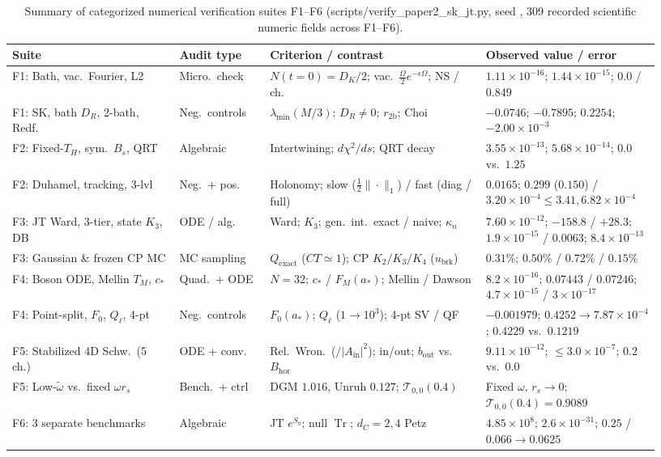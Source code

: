 \documentclass[11pt,a4paper]{article}
\theoremstyle{definition}
\theoremstyle{remark}
\newcommand{\Tr}{\operatorname{Tr}}
\newcommand{\cT}{\mathcal{T}}
\newcommand{\1}{\mathbf{1}}
\newcommand{\code}[1]{{\scriptsize\ttfamily #1}}
\begin{document}
\begin{table}[!tb]
\centering\scriptsize\setlength{\tabcolsep}{3.8pt}
\caption{Summary of categorized numerical verification suites F1--F6 (\code{scripts/verify\_\allowbreak paper2\_\allowbreak sk\_\allowbreak jt.py}, seed \code{20261127}, 309 recorded scientific numeric fields across F1--F6).}
\label{tab:numerics}
\begin{tabular}{@{}>{\raggedright\arraybackslash}p{0.24\linewidth}>{\raggedright\arraybackslash}p{0.13\linewidth}>{\raggedright\arraybackslash}p{0.31\linewidth}>{\raggedleft\arraybackslash}p{0.25\linewidth}@{}}
\toprule
Suite & Audit type & Criterion / contrast & Observed value / error \\
\midrule
F1: Bath, vac.\ Fourier, L2 & Micro.\ check & $N(t=0)=D_K/2$; vac.\ $\frac{\Omega}{2}e^{-\epsilon\Omega}$; NS / ch. & $1.11\times 10^{-16}$; $1.44\times 10^{-15}$; $0.0$ / $0.849$ \\
F1: SK, bath $D_R$, 2-bath, Redf. & Neg.\ controls & $\lambda_{\min}(M/3)$; $D_R\neq 0$; $r_{\mathrm{2b}}$; Choi & $-0.0746$; $-0.7895$; $0.2254$; $-2.00\times 10^{-3}$ \\
F2: Fixed-$T_H$, sym.\ $B_s$, QRT & Algebraic & Intertwining; $d\chi^2/ds$; QRT decay & $3.55\times 10^{-13}$; $5.68\times 10^{-14}$; $0.0$ vs.\ $1.25$ \\
F2: Duhamel, tracking, 3-lvl & Neg.\ + pos. & Holonomy; slow ($\frac{1}{2}\|\cdot\|_1$) / fast (diag / full) & $0.0165$; $0.299$ ($0.150$) / $3.20\times 10^{-4}\le 3.41,6.82\times 10^{-4}$ \\
F3: JT Ward, 3-tier, state $K_3$, DB & ODE / alg. & Ward; $K_3$; gen.\ int.\ exact / naive; $\kappa_n$ & $7.60\times 10^{-12}$; $-158.8$ / $+28.3$; $1.9\times 10^{-15}$ / $0.0063$; $8.4\times 10^{-13}$ \\
F3: Gaussian \& frozen CP MC & MC sampling & $Q_{\mathrm{exact}}$ ($CT\simeq 1$); CP $K_2/K_3/K_4$ ($u_{\mathrm{brk}}$) & $0.31\%$; $0.50\%$ / $0.72\%$ / $0.15\%$ \\
F4: Boson ODE, Mellin $T_M$, $c_*$ & Quad.\ + ODE & $N=32$; $c_*$ / $F_M(a_*)$; Mellin / Dawson & $8.2\times 10^{-16}$; $0.07443$ / $0.07246$; $4.7\times 10^{-15}$ / $3\times 10^{-17}$ \\
F4: Point-split, $F_0$, $Q_\ell$, 4-pt & Neg.\ controls & $F_0(a_*)$; $Q_\ell$ ($1\to 10^3$); 4-pt SV / QF & $-0.001979$; $0.4252\to 7.87\times 10^{-4}$; $0.4229$ vs.\ $0.1219$ \\
F5: Stabilized 4D Schw.\ (5 ch.) & ODE + conv. & Rel.\ Wron.\ ($/|A_{\mathrm{in}}|^2$); in/out; $b_{\mathrm{out}}$ vs.\ $B_{\mathrm{hor}}$ & $9.11\times 10^{-12}$; $\le 3.0\times 10^{-7}$; $0.2$ vs.\ $0.0$ \\
F5: Low-$\tilde{\omega}$ vs.\ fixed $\omega r_s$ & Bench.\ + ctrl & DGM $1.016$, Unruh $0.127$; $\cT_{0,0}(0.4)$ & Fixed $\omega,\,r_s\to 0$; $\cT_{0,0}(0.4)=0.9089$ \\
F6: 3 separate benchmarks & Algebraic & JT $e^{S_0}$; null $\Tr$; $d_C=2,4$ Petz & $4.85\times 10^8$; $2.6\times 10^{-31}$; $0.25$ / $0.066\to 0.0625$ \\
\bottomrule
\end{tabular}
\end{table}
\end{document}
